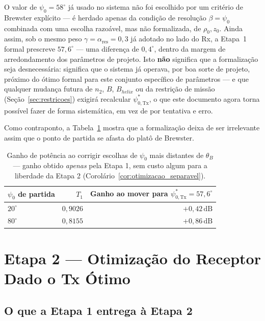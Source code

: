 \documentclass[12pt,a4paper,oneside]{book}
\newcommand{\result}[2]{%
  \begin{tcolorbox}[enhanced, breakable,
    colback=yellow!8, colframe=orange!70!black,
    fonttitle=\bfseries,
    title={\protect#1},
    attach boxed title to top left={yshift=-2mm, xshift=5mm},
    boxed title style={colback=orange!70!black}]
    #2
  \end{tcolorbox}}
\theoremstyle{definition}
\theoremstyle{remark}
\newcommand{\thetaB}{\theta_B}
\newcommand{\psiT}{\psi_{0,\mathrm{Tx}}}
\begin{document}
\result{Interpretação}{
O valor de $\psi_0=58^\circ$ já usado no sistema não foi escolhido por um
critério de Brewster explícito — é herdado apenas da condição de resolução
$\beta=\psi_0$ combinada com uma escolha razoável, mas não formalizada, de
$\rho_0,z_0$. Ainda assim, sob o mesmo peso $\gamma=\alpha_{\mathrm{res}}=0{,}3$
já adotado no lado do Rx, a Etapa~1 formal prescreve $57{,}6^\circ$ — uma
diferença de $0{,}4^\circ$, dentro da margem de arredondamento dos parâmetros de
projeto. Isto \textbf{não} significa que a formalização seja
desnecessária: significa que o sistema já operava, por boa sorte de
projeto, próximo do ótimo formal para este conjunto específico de
parâmetros — e que qualquer mudança futura de $n_2$, $B$, $B_{helix}$ ou da
restrição de missão (Seção~\ref{sec:restricoes}) exigirá recalcular
$\psiT^*$, o que este documento agora torna possível fazer de forma
sistemática, em vez de por tentativa e erro.
}

Como contraponto, a Tabela~\ref{tab:validacao_pior_caso} mostra que a
formalização deixa de ser irrelevante assim que o ponto de partida se
afasta do platô de Brewster.

\begin{table}[H]
\centering
\caption{Ganho de potência ao corrigir escolhas de $\psi_0$ mais distantes
de $\thetaB$ — ganho obtido \emph{apenas} pela Etapa 1, sem custo algum
para a liberdade da Etapa 2 (Corolário~\ref{cor:otimizacao_separavel}).}
\label{tab:validacao_pior_caso}
\begin{tabular}{lrr}
\toprule
$\psi_0$ de partida & $T_1$ & Ganho ao mover para $\psiT^*=57{,}6^\circ$ \\
\midrule
$20^\circ$ & $0{,}9026$ & $+0{,}42\,\mathrm{dB}$ \\
$80^\circ$ & $0{,}8155$ & $+0{,}86\,\mathrm{dB}$ \\
\bottomrule
\end{tabular}
\end{table}

\chapter{Etapa 2 --- Otimização do Receptor Dado o Tx Ótimo}
\label{cap:etapa2}

\section{O que a Etapa 1 entrega à Etapa 2}
\end{document}
